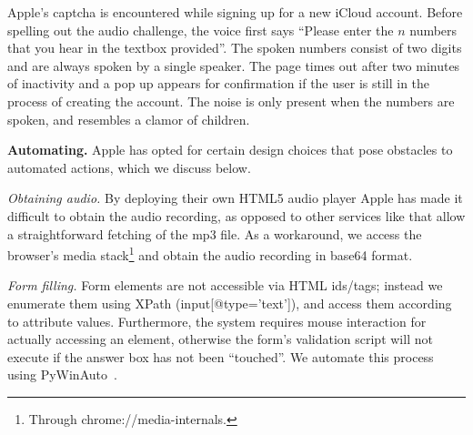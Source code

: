 Apple's captcha is encountered while signing up for a new iCloud account.
Before spelling out the audio challenge,
the voice first says ``Please enter the $n$ numbers that you hear in the textbox provided''. The 
spoken numbers consist of two digits and are always spoken by a single speaker.
The page times out after two minutes of inactivity and a pop up appears for confirmation if the user is 
still in the process of creating the account. The noise is only present when the numbers are spoken,
and resembles a clamor of children.


\textbf{Automating.} Apple has opted for certain design choices that pose obstacles to automated actions,
which we discuss below.

\emph{Obtaining audio.} By deploying their own HTML5 audio player Apple has made it 
difficult to obtain the audio recording, as opposed to other services like \re
that allow a straightforward fetching of the mp3 file. As a workaround, we access 
the browser's media stack\footnote{Through chrome://media-internals.} and obtain the 
audio recording in base64 format.

\emph{Form filling.} Form elements are not accessible via HTML ids/tags; instead we enumerate them 
using XPath (input[@type='text']), and access them according to attribute values.
Furthermore, the system requires mouse interaction for actually accessing an element, otherwise the 
form's validation script will not execute if the answer box has not been ``touched''. We automate this 
process using PyWinAuto~\cite{pywinauto}.

